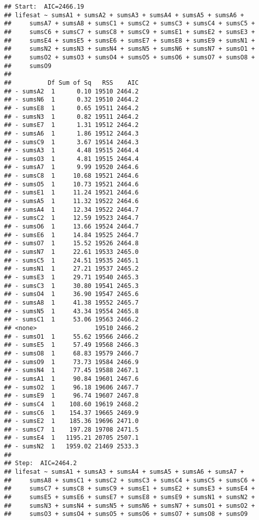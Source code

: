\documentclass[,man,floatsintext]{apa6}
\begin{document}
\begin{verbatim}
## Start:  AIC=2466.19
## lifesat ~ sumsA1 + sumsA2 + sumsA3 + sumsA4 + sumsA5 + sumsA6 + 
##     sumsA7 + sumsA8 + sumsC1 + sumsC2 + sumsC3 + sumsC4 + sumsC5 + 
##     sumsC6 + sumsC7 + sumsC8 + sumsC9 + sumsE1 + sumsE2 + sumsE3 + 
##     sumsE4 + sumsE5 + sumsE6 + sumsE7 + sumsE8 + sumsE9 + sumsN1 + 
##     sumsN2 + sumsN3 + sumsN4 + sumsN5 + sumsN6 + sumsN7 + sumsO1 + 
##     sumsO2 + sumsO3 + sumsO4 + sumsO5 + sumsO6 + sumsO7 + sumsO8 + 
##     sumsO9
## 
##          Df Sum of Sq   RSS    AIC
## - sumsA2  1      0.10 19510 2464.2
## - sumsN6  1      0.32 19510 2464.2
## - sumsE8  1      0.65 19511 2464.2
## - sumsN3  1      0.82 19511 2464.2
## - sumsE7  1      1.31 19512 2464.2
## - sumsA6  1      1.86 19512 2464.3
## - sumsC9  1      3.67 19514 2464.3
## - sumsA3  1      4.48 19515 2464.4
## - sumsO3  1      4.81 19515 2464.4
## - sumsA7  1      9.99 19520 2464.6
## - sumsC8  1     10.68 19521 2464.6
## - sumsO5  1     10.73 19521 2464.6
## - sumsE1  1     11.24 19521 2464.6
## - sumsA5  1     11.32 19522 2464.6
## - sumsA4  1     12.34 19522 2464.7
## - sumsC2  1     12.59 19523 2464.7
## - sumsO6  1     13.66 19524 2464.7
## - sumsE6  1     14.84 19525 2464.7
## - sumsO7  1     15.52 19526 2464.8
## - sumsN7  1     22.61 19533 2465.0
## - sumsC5  1     24.51 19535 2465.1
## - sumsN1  1     27.21 19537 2465.2
## - sumsE3  1     29.71 19540 2465.3
## - sumsC3  1     30.80 19541 2465.3
## - sumsO4  1     36.90 19547 2465.6
## - sumsA8  1     41.38 19552 2465.7
## - sumsN5  1     43.34 19554 2465.8
## - sumsC1  1     53.06 19563 2466.2
## <none>                19510 2466.2
## - sumsO1  1     55.62 19566 2466.2
## - sumsE5  1     57.49 19568 2466.3
## - sumsO8  1     68.83 19579 2466.7
## - sumsO9  1     73.73 19584 2466.9
## - sumsN4  1     77.45 19588 2467.1
## - sumsA1  1     90.84 19601 2467.6
## - sumsO2  1     96.18 19606 2467.7
## - sumsE9  1     96.74 19607 2467.8
## - sumsC4  1    108.60 19619 2468.2
## - sumsC6  1    154.37 19665 2469.9
## - sumsE2  1    185.36 19696 2471.0
## - sumsC7  1    197.28 19708 2471.5
## - sumsE4  1   1195.21 20705 2507.1
## - sumsN2  1   1959.02 21469 2533.3
## 
## Step:  AIC=2464.2
## lifesat ~ sumsA1 + sumsA3 + sumsA4 + sumsA5 + sumsA6 + sumsA7 + 
##     sumsA8 + sumsC1 + sumsC2 + sumsC3 + sumsC4 + sumsC5 + sumsC6 + 
##     sumsC7 + sumsC8 + sumsC9 + sumsE1 + sumsE2 + sumsE3 + sumsE4 + 
##     sumsE5 + sumsE6 + sumsE7 + sumsE8 + sumsE9 + sumsN1 + sumsN2 + 
##     sumsN3 + sumsN4 + sumsN5 + sumsN6 + sumsN7 + sumsO1 + sumsO2 + 
##     sumsO3 + sumsO4 + sumsO5 + sumsO6 + sumsO7 + sumsO8 + sumsO9

\end{verbatim}
\end{document}
